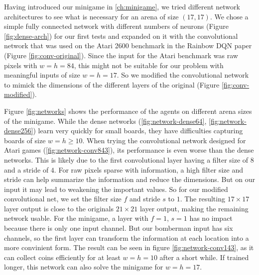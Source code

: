 
Having introduced our minigame in \ref{ch:minigame}, we tried different network architectures to see what is necessary for an arena of size $(17, 17)$.
We chose a simple fully connected network with different numbers of neurons (Figure \ref{fig:dense-arch}) for our first tests and expanded on it with the convolutional network that was used on the Atari 2600 benchmark in the Rainbow DQN paper\cite{Hessel2018RainbowCI} (Figure \ref{fig:conv-original}). Since the input for the Atari benchmark was raw pixels with $w=h=84$, this might not be suitable for our problem with meaningful inputs of size $w=h=17$. So we modified the convolutional network to mimick the dimensions of the different layers of the original (Figure \ref{fig:conv-modified}).

Figure \ref{fig:networks} shows the performance of the agents on different arena sizes of the minigame. While the dense networks (\ref{fig:network-dense64}, \ref{fig:network-dense256}) learn very quickly for small boards, they have difficulties capturing boards of size $w=h\geq10$. When trying the convolutional network designed for Atari games (\ref{fig:network-conv843}), its performance is even worse than the dense networks. This is likely due to the first convolutional layer having a filter size of $8$ and a stride of $4$. For raw pixels sparse with information, a high filter size and stride can help summarize the information and reduce the dimensions. But on our input it may lead to weakening the important values.
So for our modified convolutional net, we set the filter size $f$ and stride $s$ to $1$. The resulting $17\times17$ layer output is close to the originals $21\times21$ layer output, making the remaining network usable. For the minigame, a layer with $f=1$, $s=1$ has no impact because there is only one input channel. But our bomberman input has six channels, so the first layer can transform the information at each location into a more convinient form. The result can be seen in figure \ref{fig:network-conv143}, as it can collect coins efficiently for at least $w=h=10$ after a short while. If trained longer, this network can also solve the minigame for $w=h=17$.









